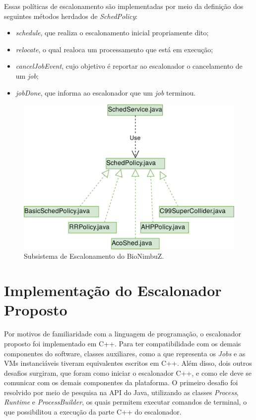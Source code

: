 Essas políticas de escalonamento são implementadas por meio da definição dos seguintes métodos herdados de \textit{SchedPolicy}:
\begin{itemize}
	\item \textit{schedule}, que realiza o escalonamento inicial propriamente dito;
	\item \textit{relocate}, o qual realoca um processamento que está em execução;
	\item \textit{cancelJobEvent}, cujo objetivo é reportar ao escalonador o cancelamento de um \textit{job};
	\item \textit{jobDone}, que informa ao escalonador que um \textit{job} terminou.
\end{itemize}

\begin{figure}[htbp]
	\centerline{\includegraphics[width=12cm]{img/ArquiteturaAntesHoriz.png}}
	\caption{Subsistema de Escalonamento do BioNimbuZ.}
	\label{ArquiteturaAtual}
\end{figure}


\section{Implementação do Escalonador Proposto}

Por motivos de familiaridade com a linguagem de programação, o escalonador proposto foi implementado em C++. Para ter compatibilidade com os demais componentes do software, classes auxiliares, como a que representa os \textit{Jobs} e as \acrshort{VM}s instanciáveis tiveram equivalentes escritos em C++. Além disso, dois outros desafios surgiram, que foram como iniciar o escalonador C++, e como ele deve se comunicar com os demais componentes da plataforma. O primeiro desafio foi resolvido por meio de pesquisa na \acrfull{API} do Java, utilizando as classes \textit{Process}\cite{JavaProcess}, \textit{Runtime}\cite{JavaRuntime} e \textit{ProcessBuilder}\cite{JavaProcessBuilder}, os quais permitem executar comandos de terminal, o que possibilitou a execução da parte C++ do escalonador.

